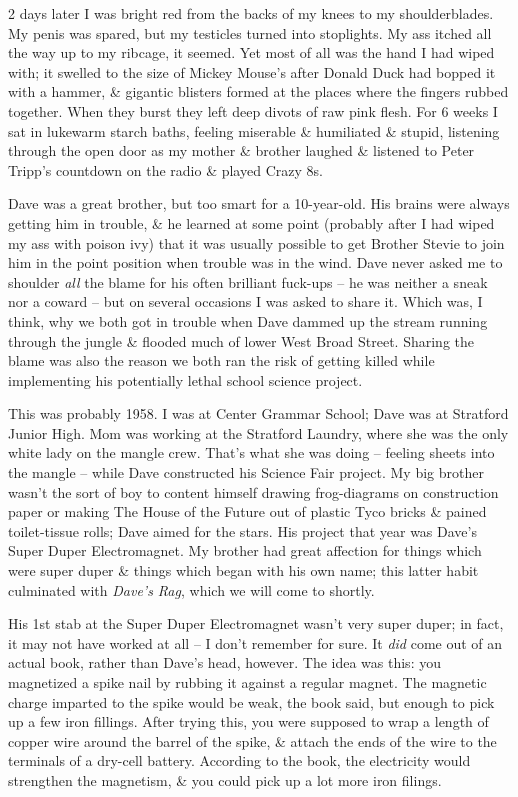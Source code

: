 \documentclass{article}
\numberwithin{equation}{section}
\begin{document}
2 days later I was bright red from the backs of my knees to my shoulderblades. My penis was spared, but my testicles turned into stoplights. My ass itched all the way up to my ribcage, it seemed. Yet most of all was the hand I had wiped with; it swelled to the size of Mickey Mouse's after Donald Duck had bopped it with a hammer, \& gigantic blisters formed at the places where the fingers rubbed together. When they burst they left deep divots of raw pink flesh. For 6 weeks I sat in lukewarm starch baths, feeling miserable \& humiliated \& stupid, listening through the open door as my mother \& brother laughed \& listened to Peter Tripp's countdown on the radio \& played Crazy 8s.

 Dave was a great brother, but too smart for a 10-year-old. His brains were always getting him in trouble, \& he learned at some point (probably after I had wiped my ass with poison ivy) that it was usually possible to get Brother Stevie to join him in the point position when trouble was in the wind. Dave never asked me to shoulder \textit{all} the blame for his often brilliant fuck-ups -- he was neither a sneak nor a coward -- but on several occasions I was asked to share it. Which was, I think, why we both got in trouble when Dave dammed up the stream running through the jungle \& flooded much of lower West Broad Street. Sharing the blame was also the reason we both ran the risk of getting killed while implementing his potentially lethal school science project.

This was probably 1958. I was at Center Grammar School; Dave was at Stratford Junior High. Mom was working at the Stratford Laundry, where she was the only white lady on the mangle crew. That's what she was doing -- feeling sheets into the mangle -- while Dave constructed his Science Fair project. My big brother wasn't the sort of boy to content himself drawing frog-diagrams on construction paper or making The House of the Future out of plastic Tyco bricks \& pained toilet-tissue rolls; Dave aimed for the stars. His project that year was Dave's Super Duper Electromagnet. My brother had great affection for things which were super duper \& things which began with his own name; this latter habit culminated with \textit{Dave's Rag}, which we will come to shortly.

His 1st stab at the Super Duper Electromagnet wasn't very super duper; in fact, it may not have worked at all -- I don't remember for sure. It \textit{did} come out of an actual book, rather than Dave's head, however. The idea was this: you magnetized a spike nail by rubbing it against a regular magnet. The magnetic charge imparted to the spike would be weak, the book said, but enough to pick up a few iron fillings. After trying this, you were supposed to wrap a length of copper wire around the barrel of the spike, \& attach the ends of the wire to the terminals of a dry-cell battery. According to the book, the electricity would strengthen the magnetism, \& you could pick up a lot more iron filings.
\end{document}
